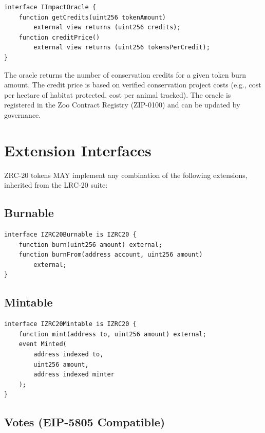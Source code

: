 \documentclass[11pt,letterpaper]{article}
\begin{document}
\begin{lstlisting}[language=Solidity,caption=IImpactOracle interface]
interface IImpactOracle {
    function getCredits(uint256 tokenAmount)
        external view returns (uint256 credits);
    function creditPrice()
        external view returns (uint256 tokensPerCredit);
}
\end{lstlisting}

The oracle returns the number of conservation credits for a given token burn amount. The credit price is based on verified conservation project costs (e.g., cost per hectare of habitat protected, cost per animal tracked). The oracle is registered in the Zoo Contract Registry (ZIP-0100) and can be updated by governance.

\section{Extension Interfaces}
\label{sec:extensions}

ZRC-20 tokens MAY implement any combination of the following extensions, inherited from the LRC-20 suite:

\subsection{Burnable}

\begin{lstlisting}[language=Solidity,caption=IZRC20Burnable]
interface IZRC20Burnable is IZRC20 {
    function burn(uint256 amount) external;
    function burnFrom(address account, uint256 amount)
        external;
}
\end{lstlisting}

\subsection{Mintable}

\begin{lstlisting}[language=Solidity,caption=IZRC20Mintable]
interface IZRC20Mintable is IZRC20 {
    function mint(address to, uint256 amount) external;
    event Minted(
        address indexed to,
        uint256 amount,
        address indexed minter
    );
}
\end{lstlisting}

\subsection{Votes (EIP-5805 Compatible)}
\end{document}
